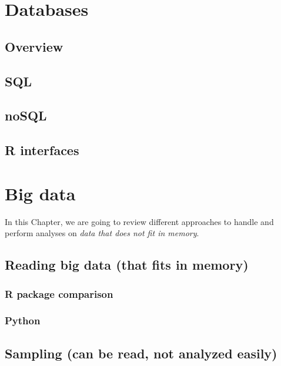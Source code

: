 \documentclass[]{book}
\theoremstyle{definition}
\theoremstyle{definition}
\theoremstyle{definition}
\theoremstyle{remark}
\begin{document}
\chapter{Databases}\label{databases}

\section{Overview}\label{overview}

\section{SQL}\label{sql}

\section{noSQL}\label{nosql}

\section{R interfaces}\label{r-interfaces}

\chapter{Big data}\label{bigdata}

In this Chapter, we are going to review different approaches to handle
and perform analyses on \emph{data that does not fit in memory}.

\section{Reading big data (that fits in
memory)}\label{reading-big-data-that-fits-in-memory}

\subsection{R package comparison}\label{r-package-comparison}

\subsection{Python}\label{python}

\section{Sampling (can be read, not analyzed
easily)}\label{sampling-can-be-read-not-analyzed-easily}
\end{document}
